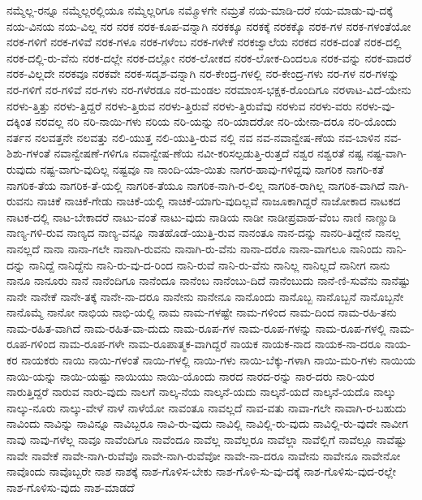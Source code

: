 {ನಮ್ಮೆಲ್ಲ-ರನ್ನೂ
ನಮ್ಮೆಲ್ಲರಲ್ಲಿಯೂ
ನಮ್ಮೆಲ್ಲರಿಗೂ
ನಮ್ಮೊಳಗೇ
ನಮ್ರತೆ
ನಯ-ಮಾಡಿ-ದರೆ
ನಯ-ಮಾಡು-ವು-ದಕ್ಕೆ
ನಯ-ವಿನಯ
ನಯ-ವಿಲ್ಲ
ನರ
ನರಕ
ನರಕ-ಕೂಪ-ವನ್ನಾಗಿ
ನರಕಕ್ಕೂ
ನರಕಕ್ಕೆ
ನರಕಕ್ಕೊ
ನರಕ-ಗಳ
ನರಕ-ಗಳಂತೆಯೋ
ನರಕ-ಗಳಿಗೆ
ನರಕ-ಗಳಿವೆ
ನರಕ-ಗಳೂ
ನರಕ-ಗಳೆಂಬ
ನರಕ-ಗಳೇಕೆ
ನರಕಜ್ವಾಲೆಯ
ನರಕದ
ನರಕ-ದಂತೆ
ನರಕ-ದಲ್ಲಿ
ನರಕ-ದಲ್ಲಿ-ರು-ವೆನು
ನರಕ-ದಲ್ಲೇ
ನರಕ-ದಲ್ಲೋ
ನರಕ-ಲೋಕದ
ನರಕ-ಲೋಕ-ದಿಂದಲೂ
ನರಕ-ವನ್ನು
ನರಕ-ವಾದರೆ
ನರಕ-ವಿಲ್ಲದೇ
ನರಕವೂ
ನರಕವೇ
ನರಕ-ಸದೃಶ-ವನ್ನಾಗಿ
ನರ-ಕೇಂದ್ರ-ಗಳಲ್ಲಿ
ನರ-ಕೇಂದ್ರ-ಗಳು
ನರ-ಗಳ
ನರ-ಗಳನ್ನು
ನರ-ಗಳಿಗೆ
ನರ-ಗಳಿವೆ
ನರ-ಗಳು
ನರ-ಗಳೆರಡೂ
ನರ-ಮಂಡಲ
ನರಮಾಂಸ-ಭಕ್ಷಕ-ರೊಂದಿಗೂ
ನರಳಾಟ-ವಿದೆ-ಯೇನು
ನರಳು-ತ್ತಿತ್ತು
ನರಳು-ತ್ತಿದ್ದರೆ
ನರಳು-ತ್ತಿರುವ
ನರಳು-ತ್ತಿರುವೆ
ನರಳು-ತ್ತಿರುವೆವು
ನರಳುವ
ನರಳು-ವರು
ನರಳು-ವು-ದಕ್ಕಿಂತ
ನರವಲ್ಲ
ನರಿ
ನರಿ-ನಾಯಿ-ಗಳು
ನರಿಯ
ನರಿ-ಯನ್ನು
ನರಿ-ಯಾದರೋ
ನರಿ-ಯೇನಾ-ದರೂ
ನರಿ-ಯೊಂದು
ನರ್ತನ
ನಲವತ್ತನೇ
ನಲವತ್ತು
ನಲಿ-ಯುತ್ತ
ನಲಿ-ಯುತ್ತಿ-ರುವ
ನಲ್ಲಿ
ನವ
ನವ-ನವಾನ್ವೇಷ-ಣೆಯ
ನವ-ಬಾಳಿನ
ನವ-ಶಿಶು-ಗಳಂತೆ
ನವಾನ್ವೇಷಣೆ-ಗಳಿಗೂ
ನವಾನ್ವೇಷ-ಣೆಯ
ನವೀ-ಕರಿಸಲ್ಪಡುತ್ತಿ-ರುತ್ತದೆ
ನಶ್ವರ
ನಶ್ವರತೆ
ನಷ್ಟ
ನಷ್ಟ-ವಾಗಿ-ರುವುದು
ನಷ್ಟ-ವಾಗು-ವುದಿಲ್ಲ
ನಷ್ಟವೂ
ನಾ
ನಾಂದಿ-ಯಾ-ಯಿತು
ನಾಗರ-ಹಾವು-ಗಳಿದ್ದವು
ನಾಗರಿಕ
ನಾಗರಿ-ಕತೆ
ನಾಗರಿಕ-ತೆಯ
ನಾಗರಿಕ-ತೆ-ಯಲ್ಲಿ
ನಾಗರಿಕ-ತೆಯೂ
ನಾಗರಿಕ-ನಾಗಿ-ರ-ಲಿಲ್ಲ
ನಾಗರಿಕ-ರಾಗಿಲ್ಲ
ನಾಗರಿಕ-ವಾಗಿದೆ
ನಾಗಿ-ರುವನು
ನಾಚಿಕೆ
ನಾಚಿಕೆ-ಗೇಡು
ನಾಚಿಕೆ-ಯಲ್ಲಿ
ನಾಚಿಕೆ-ಯಾಗು-ವುದಿಲ್ಲವೆ
ನಾಜೂಕಾಗಿದ್ದರೆ
ನಾಜೋಕಾದ
ನಾಟಕದ
ನಾಟಕ-ದಲ್ಲಿ
ನಾಟ-ಬೇಕಾದರೆ
ನಾಟು-ವಂತೆ
ನಾಟು-ವುದು
ನಾಡಿಯ
ನಾಡೀ
ನಾಡೀಪ್ರವಾಹ-ವೆಂಬ
ನಾಣಿ
ನಾಣ್ಣುಡಿ
ನಾಣ್ಯ-ಗಳಿ-ರುವ
ನಾಣ್ಯದ
ನಾಣ್ಯ-ವನ್ನೂ
ನಾತಹೊಡೆ-ಯುತ್ತಿ-ರುವ
ನಾನಂತೂ
ನಾನ-ದನ್ನು
ನಾನರಿ-ತಿದ್ದೇನೆ
ನಾನಲ್ಲ
ನಾನಲ್ಲದೆ
ನಾನಾ
ನಾನಾ-ಗಲೇ
ನಾನಾಗಿ-ರುವನು
ನಾನಾಗಿ-ರು-ವೆನು
ನಾನಾ-ದರೊ
ನಾನಾ-ವಾಗಲೂ
ನಾನಿಂದು
ನಾನಿ-ದನ್ನು
ನಾನಿದ್ದೆ
ನಾನಿದ್ದೆನು
ನಾನಿ-ರು-ವು-ದ-ರಿಂದ
ನಾನಿ-ರುವೆ
ನಾನಿ-ರು-ವೆನು
ನಾನಿಲ್ಲ
ನಾನಿಲ್ಲದೆ
ನಾನೀಗ
ನಾನು
ನಾನೂ
ನಾನೂರು
ನಾನೆ
ನಾನೆಂದಿಗೂ
ನಾನೆಂದೂ
ನಾನೆಂಬ
ನಾನೆಂಬು-ದಿದೆ
ನಾನೆಂಬುದು
ನಾನೆ-ಣಿ-ಸುವೆನು
ನಾನೆಷ್ಟು
ನಾನೇ
ನಾನೇಕೆ
ನಾನೇ-ತಕ್ಕೆ
ನಾನೇ-ನಾ-ದರೂ
ನಾನೇನು
ನಾನೇನೂ
ನಾನೊಂದು
ನಾನೊಬ್ಬ
ನಾನೊಬ್ಬನೆ
ನಾನೊಬ್ಬನೇ
ನಾನೊಮ್ಮೆ
ನಾನೋ
ನಾಭಿಯ
ನಾಭಿ-ಯಲ್ಲಿ
ನಾಮ
ನಾಮ-ಗಳಷ್ಟೇ
ನಾಮ-ಗಳಿಂದ
ನಾಮ-ದಿಂದ
ನಾಮ-ರಹಿ-ತನು
ನಾಮ-ರಹಿತ-ವಾಗಿದೆ
ನಾಮ-ರಹಿತ-ವಾ-ದುದು
ನಾಮ-ರೂಪ-ಗಳ
ನಾಮ-ರೂಪ-ಗಳನ್ನು
ನಾಮ-ರೂಪ-ಗಳಲ್ಲಿ
ನಾಮ-ರೂಪ-ಗಳಿಂದ
ನಾಮ-ರೂಪ-ಗಳೇ
ನಾಮ-ರೂಪಾತ್ಮಕ-ವಾಗಿದ್ದರೆ
ನಾಯಕ
ನಾಯಕ-ನಾದ
ನಾಯಕ-ನಾ-ದರೂ
ನಾಯ-ಕರ
ನಾಯಕರು
ನಾಯಿ
ನಾಯಿ-ಗಳಂತೆ
ನಾಯಿ-ಗಳಲ್ಲಿ
ನಾಯಿ-ಗಳು
ನಾಯಿ-ಬೆಕ್ಕು-ಗಳಾಗಿ
ನಾಯಿ-ಮರಿ-ಗಳು
ನಾಯಿಯ
ನಾಯಿ-ಯನ್ನು
ನಾಯಿ-ಯಷ್ಟು
ನಾಯಿಯು
ನಾಯಿ-ಯೊಂದು
ನಾರದ
ನಾರದ-ರನ್ನು
ನಾರ-ದರು
ನಾರಿ-ಯರ
ನಾರುತ್ತಿದ್ದರೆ
ನಾರುವ
ನಾರು-ವುದು
ನಾಲಗೆ
ನಾಲ್ಕ-ನೆಯ
ನಾಲ್ಕನೆ-ಯದು
ನಾಲ್ಕನೆ-ಯದೆ
ನಾಲ್ಕನೆ-ಯದೊ
ನಾಲ್ಕು
ನಾಲ್ಕು-ನೂರು
ನಾಲ್ಕು-ವೇಳೆ
ನಾಳೆ
ನಾಳೆಯೋ
ನಾವಂತೂ
ನಾವಲ್ಲದೆ
ನಾವ-ವತು
ನಾವಾ-ಗಲೇ
ನಾವಾಗಿ-ರ-ಬಹುದು
ನಾವಿಂದು
ನಾವಿನ್ನು
ನಾವಿನ್ನೂ
ನಾವಿಬ್ಬರೂ
ನಾವಿ-ರು-ವುದು
ನಾವಿಲ್ಲಿ
ನಾವಿಲ್ಲಿ-ರು-ವುದು
ನಾವಿಲ್ಲಿ-ರು-ವುದೇ
ನಾವೀಗ
ನಾವು
ನಾವು-ಗಳೆಲ್ಲ
ನಾವೂ
ನಾವೆಂದಿಗೂ
ನಾವೆಂದೂ
ನಾವೆಲ್ಲ
ನಾವೆಲ್ಲರೂ
ನಾವೆಲ್ಲಾ
ನಾವೆಲ್ಲಿಗೆ
ನಾವೆಲ್ಲೂ
ನಾವೆಷ್ಟು
ನಾವೇ
ನಾವೇಕೆ
ನಾವೇ-ನಾಗಿ-ರುವೆವೊ
ನಾವೇ-ನಾಗಿ-ರುವೆವೋ
ನಾವೇ-ನಾ-ದರೂ
ನಾವೇನು
ನಾವೇನೂ
ನಾವೇನೋ
ನಾವೊಂದು
ನಾವೊಬ್ಬರೇ
ನಾಶ
ನಾಶಕ್ಕೆ
ನಾಶ-ಗೊಳಿಸ-ಬೇಕು
ನಾಶ-ಗೊಳಿ-ಸು-ವು-ದಕ್ಕೆ
ನಾಶ-ಗೊಳಿಸು-ವುದ-ರಲ್ಲೇ
ನಾಶ-ಗೊಳಿಸು-ವುದು
ನಾಶ-ಮಾಡದೆ
}
